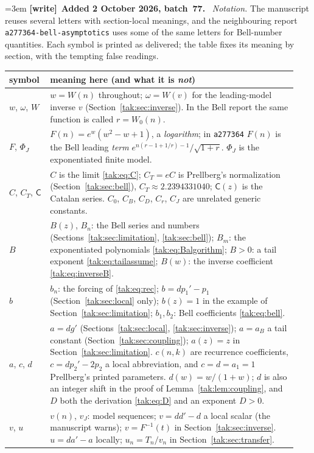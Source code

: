 \documentclass[11pt,letterpaper]{article}
\theoremstyle{remark}\newtheorem{remark}[theorem]{Remark}
\newenvironment{writenote}[1][]{\par\smallskip\begingroup\small\emergencystretch=3em
 \noindent\textbf{[write]}\if\relax\detokenize{#1}\relax\else~\textbf{#1.}\fi\ }%
 {\par\endgroup\smallskip}
\begin{document}
\begin{writenote}[Added 2 October 2026, batch~77]
\emph{Notation.} The manuscript reuses several letters with section-local
meanings, and the neighbouring report \texttt{a277364-\allowbreak bell-\allowbreak asymptotics}
uses some of the same letters for Bell-number quantities. Each symbol is printed
as delivered; the table fixes its meaning by section, with the tempting false
readings.
\begin{center}\footnotesize
\begin{tabular}{@{}>{\raggedright\arraybackslash}p{0.13\linewidth}>{\raggedright\arraybackslash}p{0.81\linewidth}@{}}
\toprule
symbol & meaning here (and what it is \emph{not})\\
\midrule
$w$, $\omega$, $W$ & $w=W(n)$ throughout; $\omega=W(v)$ for the leading-model inverse $v$ (Section~\ref{tak:sec:inverse}). In the Bell report the same function is called $r=W_0(n)$.\\
$F$, $\Phi_J$ & $F(n)=e^w(w^2-w+1)$, a \emph{logarithm}; in \texttt{a277364} $F(n)$ is the Bell leading \emph{term} $e^{n(r-1+1/r)-1}/\sqrt{1+r}$. $\Phi_J$ is the exponentiated finite model.\\
$C$, $C_T$, $\mathsf C$ & $C$ is the limit \eqref{tak:eq:C}; $C_T=eC$ is Prellberg's normalization (Section~\ref{tak:sec:bell}), $C_T\approx2.2394331040$; $\mathsf C(z)$ is the Catalan series. $C_0$, $C_B$, $C_D$, $C_r$, $C_J$ are unrelated generic constants.\\
$B$ & $B(z)$, $B_n$: the Bell series and numbers (Sections~\ref{tak:sec:limitation}, \ref{tak:sec:bell}); $B_m$: the exponentiated polynomials \eqref{tak:eq:Balgorithm}; $B>0$: a tail exponent \eqref{tak:eq:tailassume}; $B(w)$: the inverse coefficient \eqref{tak:eq:inverseB}.\\
$b$ & $b_n$: the forcing of \eqref{tak:eq:rec}; $b=dp_1'-p_1$ (Section~\ref{tak:sec:local} only); $b(z)=1$ in the example of Section~\ref{tak:sec:limitation}; $b_1,b_2$: Bell coefficients \eqref{tak:eq:bell}.\\
$a$, $c$, $d$ & $a=dg'$ (Sections~\ref{tak:sec:local}, \ref{tak:sec:inverse}); $a=a_B$ a tail constant (Section~\ref{tak:sec:coupling}); $a(z)=z$ in Section~\ref{tak:sec:limitation}. $c(n,k)$ are recurrence coefficients, $c=dp_2'-2p_2$ a local abbreviation, and $c=d=a_1=1$ Prellberg's printed parameters. $d(w)=w/(1+w)$; $d$ is also an integer shift in the proof of Lemma~\ref{tak:lem:coupling}, and $D$ both the derivation \eqref{tak:eq:D} and an exponent $D>0$.\\
$v$, $u$ & $v(n)$, $v_J$: model sequences; $v=dd'-d$ a local scalar (the manuscript warns); $v=F^{-1}(t)$ in Section~\ref{tak:sec:inverse}. $u=da'-a$ locally; $u_n=T_n/v_n$ in Section~\ref{tak:sec:transfer}.\\

\end{tabular}
\end{center}
\end{writenote}
\end{document}
